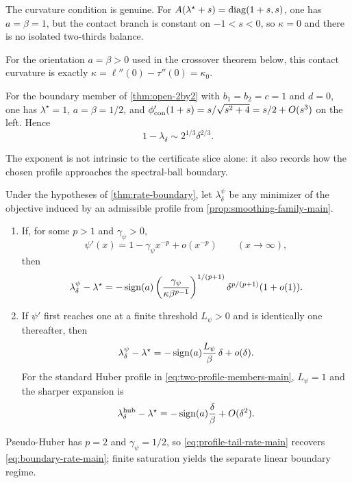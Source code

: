 The curvature condition is genuine.  For
\(A(\lambda^\star+s)=\operatorname{diag}(1+s,s)\), one has \(a=\beta=1\), but the contact
branch is constant on \(-1<s<0\), so \(\kappa=0\) and there is no isolated
two-thirds balance.

For the orientation \(a=\beta>0\) used in the crossover theorem below,
this contact curvature is exactly
\(\kappa=\ell''(0)-\tau''(0)=\kappa_0\).

For the boundary member of \cref{thm:open-2by2} with \(b_1=b_2=c=1\) and
\(d=0\), one has \(\lambda^\star=1\), \(a=\beta=1/2\), and
\(\phi'_{\rm con}(1+s)=s/\sqrt{s^2+4}=s/2+O(s^3)\) on the left.  Hence
\begin{equation}
 1-\lambda_\delta\sim2^{1/3}\delta^{2/3}.
 \label{eq:boundary-example-main}
\end{equation}

The exponent is not intrinsic to the certificate slice alone: it also records
how the chosen profile approaches the spectral-ball boundary.

\begin{corollary}
\label{cor:profile-tail-rate-main}
Under the hypotheses of \cref{thm:rate-boundary}, let
\(\lambda_\delta^\psi\) be any minimizer of the objective induced by an admissible
profile from \cref{prop:smoothing-family-main}.
\begin{enumerate}
 \item If, for some \(p>1\) and \(\gamma_\psi>0\),
 \begin{equation}
  \psi'(x)=1-\gamma_\psi x^{-p}+o(x^{-p})
  \qquad(x\to\infty),
  \label{eq:profile-polynomial-tail-main}
 \end{equation}
 then
 \begin{equation}
  \lambda_\delta^\psi-\lambda^\star
  =-\operatorname{sign}(a)
  \left(\frac{\gamma_\psi}{\kappa\beta^{p-1}}\right)^{1/(p+1)}
  \delta^{p/(p+1)}(1+o(1)).
  \label{eq:profile-tail-rate-main}
 \end{equation}
 \item If \(\psi'\) first reaches one at a finite threshold
 \(L_\psi>0\) and is identically one thereafter, then
 \begin{equation}
  \lambda_\delta^\psi-\lambda^\star
  =-\operatorname{sign}(a)\frac{L_\psi}{\beta}\,\delta+o(\delta).
  \label{eq:saturated-boundary-rate-main}
 \end{equation}
 For the standard Huber profile in \eqref{eq:two-profile-members-main},
 \(L_\psi=1\) and the sharper expansion is
 \begin{equation}
  \lambda_\delta^{\rm hub}-\lambda^\star
  =-\operatorname{sign}(a)\frac{\delta}{\beta}+O(\delta^2).
  \label{eq:huber-boundary-rate-main}
 \end{equation}
\end{enumerate}
Pseudo-Huber has \(p=2\) and \(\gamma_\psi=1/2\), so
\eqref{eq:profile-tail-rate-main} recovers
\eqref{eq:boundary-rate-main}; finite saturation yields the separate linear
boundary regime.
\end{corollary}

